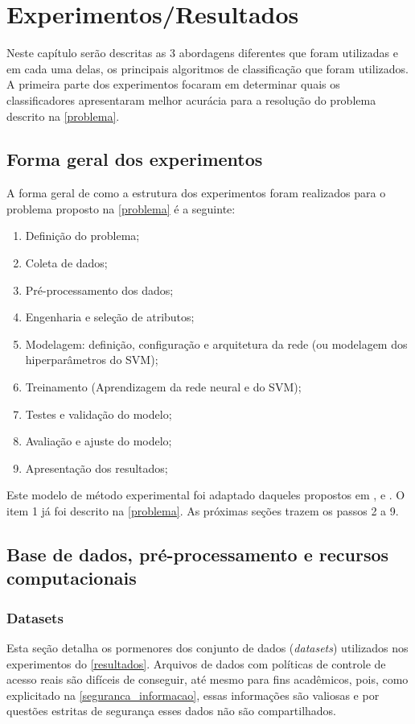 \chapter{Experimentos/Resultados}\label{resultados}
Neste capítulo serão descritas as 3 abordagens diferentes que foram utilizadas e em cada uma delas, os principais algoritmos de classificação que foram utilizados. A primeira parte dos experimentos focaram em determinar quais os classificadores apresentaram melhor acurácia para a resolução do problema descrito na \autoref{problema}.

\section{Forma geral dos experimentos}\label{forma_geral_experimentos}
A forma geral de como a estrutura dos experimentos foram realizados para o problema proposto na \autoref{problema} é a seguinte:
\begin{enumerate}
	\item Definição do problema;
	\item Coleta de dados;
	\item Pré-processamento dos dados;
	\item Engenharia e seleção de atributos;
	\item Modelagem: definição, configuração e arquitetura da rede (ou modelagem dos hiperparâmetros do SVM);
	\item Treinamento (Aprendizagem da rede neural e do SVM);
	\item Testes e validação do modelo;
		\item Avaliação e ajuste do modelo;
	\item Apresentação dos resultados;
\end{enumerate}

Este modelo de método experimental foi adaptado daqueles propostos em ,  e . O item 1 já foi descrito na \autoref{problema}. As próximas seções trazem os passos 2 a 9.

\section{Base de dados, pré-processamento e recursos computacionais}\label{base_dados-pre-recursos}
\subsection{Datasets}
Esta seção detalha os pormenores dos conjunto de dados (\textit{datasets}) utilizados nos experimentos do \autoref{resultados}.
Arquivos de dados com políticas de controle de acesso reais são difíceis de conseguir, até mesmo para fins acadêmicos, pois, como explicitado na \autoref{seguranca_informacao}, essas informações são valiosas e por questões estritas de segurança esses dados não são compartilhados.

